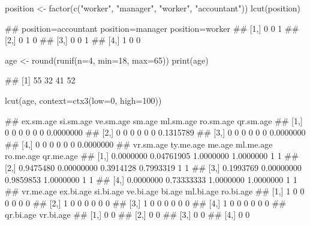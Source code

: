 \documentclass{article}\usepackage[]{graphicx}\usepackage[]{color}
\begin{document}
\begin{Schunk}
% --begin: "lcut.factor"
\begin{Sinput}
position <- factor(c("worker", "manager", "worker", "accountant"))
lcut(position)
\end{Sinput}
\begin{Soutput}
##      position=accountant position=manager position=worker
## [1,]                   0                0               1
## [2,]                   0                1               0
## [3,]                   0                0               1
## [4,]                   1                0               0
\end{Soutput}
%
% --end: "lcut.factor"
\end{Schunk}

\begin{Schunk}
% --begin: "lcut.numeric"
\begin{Sinput}
age <- round(runif(n=4, min=18, max=65))
print(age)
\end{Sinput}
\begin{Soutput}
## [1] 55 32 41 52
\end{Soutput}
\begin{Sinput}
lcut(age,
     context=ctx3(low=0, high=100))
\end{Sinput}
\begin{Soutput}
##      ex.sm.age si.sm.age ve.sm.age sm.age ml.sm.age ro.sm.age qr.sm.age
## [1,]         0         0         0      0         0         0 0.0000000
## [2,]         0         0         0      0         0         0 0.1315789
## [3,]         0         0         0      0         0         0 0.0000000
## [4,]         0         0         0      0         0         0 0.0000000
##      vr.sm.age  ty.me.age    me.age ml.me.age ro.me.age qr.me.age
## [1,] 0.0000000 0.04761905 1.0000000 1.0000000         1         1
## [2,] 0.9475480 0.00000000 0.3914128 0.7993319         1         1
## [3,] 0.1993769 0.00000000 0.9859853 1.0000000         1         1
## [4,] 0.0000000 0.73333333 1.0000000 1.0000000         1         1
##      vr.me.age ex.bi.age si.bi.age ve.bi.age bi.age ml.bi.age ro.bi.age
## [1,]         1         0         0         0      0         0         0
## [2,]         1         0         0         0      0         0         0
## [3,]         1         0         0         0      0         0         0
## [4,]         1         0         0         0      0         0         0
##      qr.bi.age vr.bi.age
## [1,]         0         0
## [2,]         0         0
## [3,]         0         0
## [4,]         0         0
\end{Soutput}
%
% --end: "lcut.numeric"
\end{Schunk}
\end{document}
